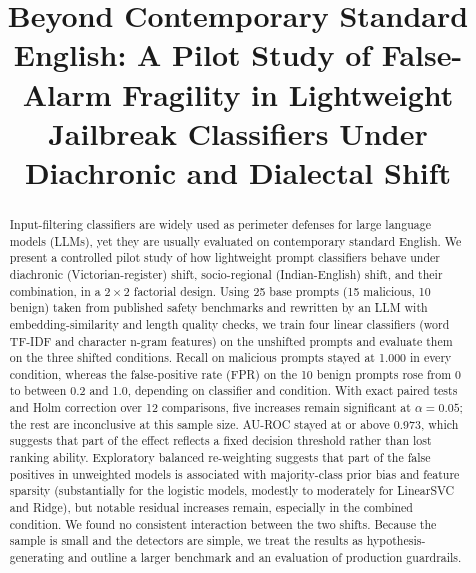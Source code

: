 \documentclass[conference]{IEEEtran}
\begin{document}
\title{Beyond Contemporary Standard English: A Pilot Study of False-Alarm Fragility in Lightweight Jailbreak Classifiers Under Diachronic and Dialectal Shift}

\author{
}

\maketitle

\begin{abstract}
Input-filtering classifiers are widely used as perimeter defenses for large language models (LLMs), yet they are usually evaluated on contemporary standard English. We present a controlled pilot study of how lightweight prompt classifiers behave under diachronic (Victorian-register) shift, socio-regional (Indian-English) shift, and their combination, in a $2 \times 2$ factorial design. Using 25 base prompts (15 malicious, 10 benign) taken from published safety benchmarks and rewritten by an LLM with embedding-similarity and length quality checks, we train four linear classifiers (word TF-IDF and character n-gram features) on the unshifted prompts and evaluate them on the three shifted conditions. Recall on malicious prompts stayed at 1.000 in every condition, whereas the false-positive rate (FPR) on the 10 benign prompts rose from 0 to between 0.2 and 1.0, depending on classifier and condition. With exact paired tests and Holm correction over 12 comparisons, five increases remain significant at $\alpha = 0.05$; the rest are inconclusive at this sample size. AU-ROC stayed at or above 0.973, which suggests that part of the effect reflects a fixed decision threshold rather than lost ranking ability. Exploratory balanced re-weighting suggests that part of the false positives in unweighted models is associated with majority-class prior bias and feature sparsity (substantially for the logistic models, modestly to moderately for LinearSVC and Ridge), but notable residual increases remain, especially in the combined condition. We found no consistent interaction between the two shifts. Because the sample is small and the detectors are simple, we treat the results as hypothesis-generating and outline a larger benchmark and an evaluation of production guardrails.
\end{abstract}
\end{document}
